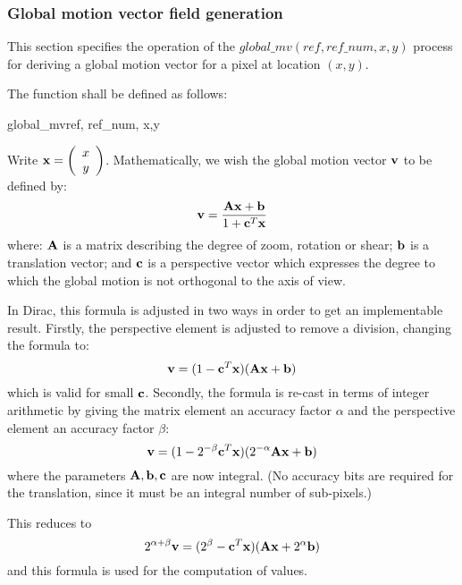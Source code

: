 \subsubsection{Global motion vector field generation}
\label{globalmv}

This section specifies the operation of the $global\_mv(ref, ref\_num, x,y)$ process
for deriving a global motion vector for a pixel at location $(x,y)$.

The function shall be defined as follows:

\begin{pseudo}{global\_mv}{ref, ref\_num, x,y}
\end{pseudo}

\begin{informative}
Write ${\bf x}=\left( \begin{array}{c} x\\y \end{array}\right)$. 
Mathematically, we wish the global motion vector ${\bf v}$ to be defined by:
\[{\bf v}=\dfrac{{\bf Ax}+{\bf b}}{1+{\bf c}^T{\bf x}}\]
where: ${\bf A}$ is a matrix describing the degree of zoom, rotation or shear; ${\bf b}$
is a translation vector; and ${\bf c}$ is a perspective vector which expresses the
degree to which the global motion is not orthogonal to the axis of view.

In Dirac, this formula is adjusted in two ways in order to get an implementable result.
Firstly, the perspective element is adjusted to remove a division, changing the 
formula to:
\[{\bf v}=(1-{\bf c}^T{\bf x})({\bf Ax}+{\bf b})\]
which is valid for small ${\bf c}$. Secondly, the formula is re-cast in terms of integer
arithmetic by giving the matrix element an accuracy factor $\alpha$ and the perspective
element an accuracy factor $\beta$:
\[{\bf v}=(1-2^{-\beta}{\bf c}^T{\bf x})(2^{-\alpha}{\bf Ax}+{\bf b})\]
where the parameters ${\bf A}, {\bf b},{\bf c}$ are now integral. (No accuracy bits are required for the translation, since it must be an integral number of sub-pixels.) 

This reduces to
\[2^{\alpha+\beta}{\bf v}=(2^\beta-{\bf c}^T{\bf x})({\bf Ax}+2^\alpha{\bf b})\]
and this formula is used for the computation of values.
\end{informative}

